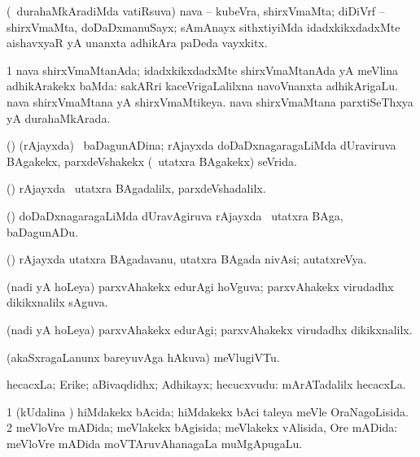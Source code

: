 \bentry
{} 
\gl{\nA}
\expl{}
\bmng
(\kanmu\ durahaMkAradiMda vatiRsuva) nava -- kubeVra, shirxVmaMta; diDiVrf -- shirxVmaMta, doDaDxmanuSayx; sAmAnayx sithxtiyiMda idadxkikxdadxMte aishavxyaR yA unanxta adhikAra paDeda vayxkitx. 
\emng
\eentry

\bentry
{} 
\gl{\gu}
\expl{}
\bmng
\bnum
\num{1} nava shirxVmaMtanAda; idadxkikxdadxMte shirxVmaMtanAda yA meVlina adhikArakekx baMda:  sakARri kaceVrigaLalilxna navoVnanxta adhikArigaLu. 
\banum
{} nava shirxVmaMtana yA shirxVmaMtikeya. 
 nava shirxVmaMtana parxtiSeThxya yA durahaMkArada. 
\eanum
\numie
\enum
\emng
\eentry

\bentry
{} 
\gl{\gu}
\expl{}
\bmng
(\ame) (rAjayxda) \kanmu\ baDagunADina; rAjayxda doDaDxnagaragaLiMda dUraviruva BAgakekx, parxdeVshakekx (\kanmu\ utatxra BAgakekx) seVrida. 
\emng
\eentry

\bentry
{} 
\gl{\kirxvi}
\expl{}
\bmng
(\ame) rAjayxda \kanmu\ utatxra BAgadalilx, parxdeVshadalilx. 
\emng
\eentry

\bentry
{} 
\gl{\nA}
\expl{}
\bmng
(\ame) doDaDxnagaragaLiMda dUravAgiruva rAjayxda \kanmu\ utatxra BAga, baDagunADu. 
\emng
\eentry

\bentry
{} 
\gl{\nA}
\expl{}
\bmng
(\ame) rAjayxda utatxra BAgadavanu, utatxra BAgada nivAsi; autatxreVya. 
\emng
\eentry

\bentry
{} 
\gl{\gu}
\expl{}
\bmng
(nadi yA hoLeya) parxvAhakekx edurAgi hoVguva; parxvAhakekx virudadhx dikikxnalilx sAguva. 
\emng
\eentry

\bentry
{} 
\gl{\kirxvi}
\expl{}
\bmng
(nadi yA hoLeya) parxvAhakekx edurAgi; parxvAhakekx virudadhx dikikxnalilx. 
\emng
\eentry

\bentry
{} 
\gl{\nA}
\expl{}
\bmng
(akaSxragaLanunx bareyuvAga hAkuva) meVlugiVTu. 
\emng
\eentry

\bentry
{} 
\gl{\nA}
\expl{}
\bmng
hecacxLa; Erike; aBivaqdidhx; Adhikayx; hecucxvudu:  mArATadalilx hecacxLa. 
\emng
\eentry

\bentry
{} 
\gl{\gu}
\bmng
\bnum
\num{1} (kUdalina \vi) hiMdakekx bAcida; hiMdakekx bAci taleya meVle OraNagoLisida.
\num{2} meVloVre mADida; meVlakekx bAgisida; meVlakekx vAlisida, Ore mADida:  meVloVre mADida moVTAruvAhanagaLa muMgApugaLu. 
\enum
\emng
\eentry

